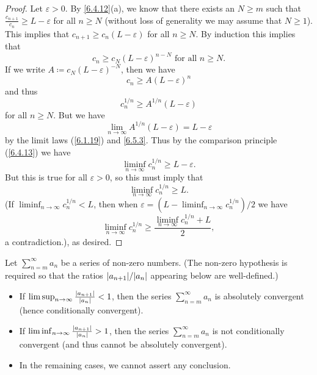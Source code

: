 \begin{proof}
  Let \(\varepsilon > 0\).
  By \cref{6.4.12}(a), we know that there exists an \(N \geq m\) such that \(\frac{c_{n + 1}}{c_n} \geq L - \varepsilon\) for all \(n \geq N\)
  (without loss of generality we may assume that \(N \geq 1\)).
  This implies that \(c_{n + 1} \geq c_n (L - \varepsilon)\) for all \(n \geq N\).
  By induction this implies that
  \[
    c_n \geq c_N (L - \varepsilon)^{n - N} \text{ for all } n \geq N.
  \]
  If we write \(A \coloneqq c_N (L - \varepsilon)^{-N}\), then we have
  \[
    c_n \geq A(L - \varepsilon)^n
  \]
  and thus
  \[
    c_n^{1 / n} \geq A^{1 / n} (L - \varepsilon)
  \]
  for all \(n \geq N\).
  But we have
  \[
    \lim_{n \to \infty} A^{1 / n} (L - \varepsilon) = L - \varepsilon
  \]
  by the limit laws (\cref{6.1.19}) and \cref{6.5.3}.
  Thus by the comparison principle (\cref{6.4.13}) we have
  \[
    \liminf_{n \to \infty} c_n^{1 / n} \geq L - \varepsilon.
  \]
  But this is true for all \(\varepsilon > 0\), so this must imply that
  \[
    \liminf_{n \to \infty} c_n^{1 / n} \geq L.
  \]
  (If \(\liminf_{n \to \infty} c_n^{1 / n} < L\), then when \(\varepsilon = (L - \liminf_{n \to \infty} c_n^{1 / n}) / 2\) we have
  \[
    \liminf_{n \to \infty} c_n^{1 / n} \geq \frac{\liminf_{n \to \infty} c_n^{1 / n} + L}{2},
  \]
  a contradiction.), as desired.
\end{proof}

\begin{corollary}\label{7.5.3}
  Let \(\sum_{n = m}^\infty a_n\) be a series of non-zero numbers.
  (The non-zero hypothesis is required so that the ratios \(\abs{a_{n + 1}} / \abs{a_n}\) appearing below are well-defined.)
  \begin{itemize}
    \item If \(\limsup_{n \to \infty} \frac{\left\lvert a_{n + 1}\right\rvert}{\left\lvert a_n\right\rvert} < 1\), then the series \(\sum_{n = m}^\infty a_n\) is absolutely convergent (hence conditionally convergent).
    \item If \(\liminf_{n \to \infty} \frac{\left\lvert a_{n + 1}\right\rvert}{\left\lvert a_n\right\rvert} > 1\), then the series \(\sum_{n = m}^\infty a_n\) is not conditionally convergent (and thus cannot be absolutely convergent).
    \item In the remaining cases, we cannot assert any conclusion.
  \end{itemize}
\end{corollary}

